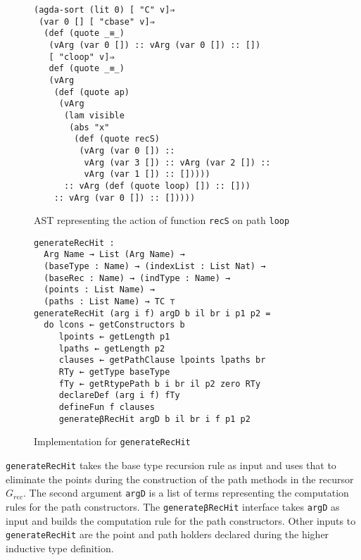 \documentclass[sigplan,10pt]{acmart}
\begin{document}
\begin{figure}
\begin{center}
\begingroup
\fontsize{7pt}{9pt}\selectfont
\begin{Verbatim}
(agda-sort (lit 0) [ "C" v]⇒
 (var 0 [] [ "cbase" v]⇒
  (def (quote _≡_)
   (vArg (var 0 []) :: vArg (var 0 []) :: [])
   [ "cloop" v]⇒
   def (quote _≡_)
   (vArg
    (def (quote ap)
     (vArg
      (lam visible
       (abs "x"
        (def (quote recS)
         (vArg (var 0 []) ::
          vArg (var 3 []) :: vArg (var 2 []) :: 
          vArg (var 1 []) :: []))))
      :: vArg (def (quote loop) []) :: []))
    :: vArg (var 0 []) :: []))))
\end{Verbatim}
\endgroup
\end{center}
\caption{AST representing the action of function {\tt recS} on path {\tt loop}}
\label{fig:ast-beta-f}
\end{figure}
\normalsize

\begin{figure}
\begin{center}
\begingroup
\fontsize{7pt}{9pt}\selectfont
\begin{Verbatim}
generateRecHit : 
  Arg Name → List (Arg Name) →
  (baseType : Name) → (indexList : List Nat) →
  (baseRec : Name) → (indType : Name) →
  (points : List Name) → 
  (paths : List Name) → TC ⊤
generateRecHit (arg i f) argD b il br i p1 p2 =
  do lcons ← getConstructors b
     lpoints ← getLength p1
     lpaths ← getLength p2
     clauses ← getPathClause lpoints lpaths br
     RTy ← getType baseType
     fTy ← getRtypePath b i br il p2 zero RTy
     declareDef (arg i f) fTy
     defineFun f clauses
     generateβRecHit argD b il br i f p1 p2
\end{Verbatim}
\endgroup
\end{center}
\caption{Implementation for {\tt generateRecHit}}
\label{fig:generateRecHit}
\end{figure}
\normalsize

{\tt generateRecHit} takes the base type recursion rule as input and uses that to eliminate the points during the construction of the path methods in the recursor $G_{rec}$. The second argument {\tt argD} is a list of terms representing the computation rules for the path constructors. The {\tt generateβRecHit} interface takes {\tt argD} as input and builds the computation rule for the path constructors. Other inputs to {\tt generateRecHit} are the point and path holders declared during the higher inductive type definition.
\end{document}
